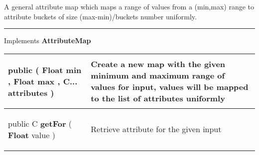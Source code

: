  {\scriptsize A general attribute map which maps a range of values from a (min,max) range to attribute buckets of size (max{-}min)/buckets number uniformly.
 
\vspace*{4pt} \hrule \vspace*{3pt}
Implements \textbf{ AttributeMap }
\vspace*{-5pt} 
\begin{tabularx}{\linewidth}{m{}|m{}}
\label{tab:UniformAttributeMap}
\begin{raggedleft}public  \textbf{\hyperref[tab:UniformAttributeMap]{\color{blue}{UniformAttributeMap}} }(\newline \hfill 
\hspace*{ 5pt} \textbf{Float} min , \newline
 \hspace*{ 5pt} \textbf{Float} max , \newline
 \hspace*{ 5pt} \textbf{C...} attributes  )
\end{raggedleft} &
 Create a new map with the given minimum and maximum range of values for input, values will be mapped to the list of attributes uniformly\\ \hline 
\begin{raggedleft}public C \textbf{getFor }(\hspace*{ 5pt} \textbf{Float} value  )
\end{raggedleft} &
 Retrieve attribute for the given input\\\end{tabularx}
}
